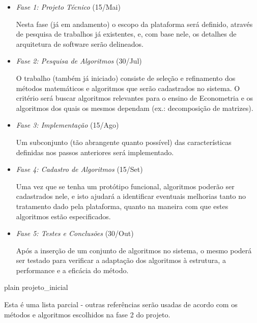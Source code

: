\documentclass[11pt]{article}
\begin{document}
\begin{itemize}

\item {\em Fase 1: Projeto Técnico} (15/Mai)

Nesta fase (já em andamento) o escopo da plataforma será definido, através de pesquisa de trabalhos já existentes, e, com base nele, os detalhes de arquitetura de software serão delineados.

\item {\em Fase 2: Pesquisa de Algoritmos} (30/Jul)

O trabalho (também já iniciado) consiste de seleção e refinamento dos métodos matemáticos e algoritmos que serão cadastrados no sistema. O critério será buscar algoritmos relevantes para o ensino de Econometria e os algoritmos dos quais os mesmos dependam (ex.: decomposição de matrizes).

\item {\em Fase 3: Implementação} (15/Ago)

Um subconjunto (tão abrangente quanto possível) das características definidas nos passos anteriores será implementado.

\item {\em Fase 4: Cadastro de Algoritmos} (15/Set)

Uma vez que se tenha um protótipo funcional, algoritmos poderão ser cadastrados nele, e isto ajudará a identificar eventuais melhorias tanto no tratamento dado pela plataforma, quanto na maneira com que estes algoritmos estão especificados.

\item {\em Fase 5: Testes e Conclusões} (30/Out)

Após a inserção de um conjunto de algoritmos no sistema, o mesmo poderá ser testado para verificar a adaptação dos algoritmos à estrutura, a performance e a eficácia do método.

\end{itemize}
\pagebreak
\nocite{*}
 {plain}
 {projeto_inicial}

Esta é uma lista parcial - outras referências serão usadas de acordo com os métodos e algoritmos escolhidos na fase 2 do projeto.
\end{document}

